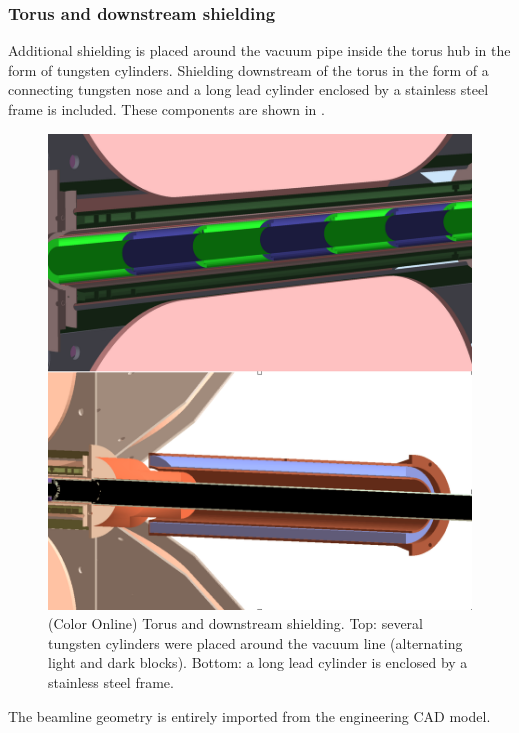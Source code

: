 \subsubsection{Torus and downstream shielding}
Additional shielding is placed around the vacuum pipe inside the torus hub in the form of tungsten cylinders.
Shielding downstream of the torus in the form of a connecting tungsten nose and a long lead cylinder enclosed
by a stainless steel frame is included. These components are shown in .

\begin{figure}
	\centering
	\includegraphics[width=0.98\columnwidth,keepaspectratio]{img/downstreamShielding.png}
	\caption{(Color Online) Torus and downstream shielding. Top: several tungsten cylinders were placed around the vacuum line
			 (alternating light and dark blocks).
             Bottom: a long lead cylinder is enclosed by a stainless steel frame.}
	\label{fig:downstreamShielding}
\end{figure}


The beamline geometry is entirely imported from the engineering CAD model.
